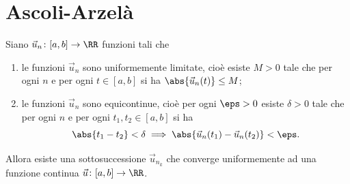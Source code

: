 \section{Ascoli-Arzelà}

\begin{theorem}
Siano $\vec u_n \colon [a,b] \to \RR$ funzioni tali che 
    \begin{enumerate}
    \item le funzioni $\vec u_n$ sono uniformemente limitate, cioè esiste
    $M>0$ tale che per ogni $n$ e per ogni $t\in [a,b]$ si ha 
    $\abs{\vec u_n(t)} \le M$;
    \item le funzioni $\vec u_n$ sono equicontinue, cioè per ogni $\eps>0$ esiste 
    $\delta>0$ tale che per ogni $n$ e per ogni $t_1,t_2 \in [a,b]$ si ha 
    \[
    \abs{t_1-t_2}<\delta \implies 
    \abs{\vec u_n(t_1) - \vec u_n(t_2)} < \eps.
    \]
    \end{enumerate} 
Allora esiste una sottosuccessione $\vec u_{n_k}$ che converge uniformemente
ad una funzione continua $\vec u \colon [a,b] \to \RR$.
\end{theorem}   

